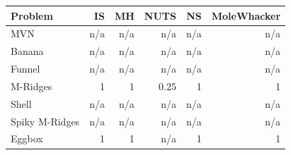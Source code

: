 \begin{tabular}{lrrrrr}
\toprule
Problem & IS & MH & NUTS & NS & MoleWhacker \\
\midrule
MVN & n/a & n/a & n/a & n/a & n/a \\
Banana & n/a & n/a & n/a & n/a & n/a \\
Funnel & n/a & n/a & n/a & n/a & n/a \\
M-Ridges & 1 & 1 & 0.25 & 1 & 1 \\
Shell & n/a & n/a & n/a & n/a & n/a \\
Spiky M-Ridges & n/a & n/a & n/a & n/a & n/a \\
\midrule
Eggbox & 1 & 1 & n/a & 1 & 1 \\
\bottomrule
\end{tabular}
